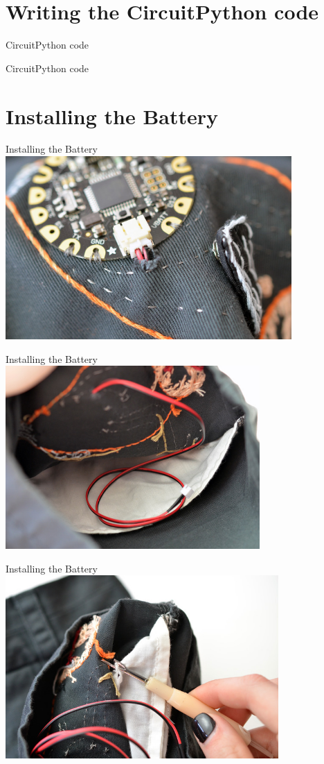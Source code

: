 \documentclass[aspectratio=169]{beamer}
\begin{document}
\part{Writing the CircuitPython code}
\begin{frame}[fragile]{CircuitPython code}

\end{frame}
\begin{frame}[fragile]{CircuitPython code}

\end{frame}
\part{Installing the Battery}
\begin{frame}[fragile]{Installing the Battery}
\includegraphics[height=2.75in]{flora-angler-embroidery-28.jpg}
\end{frame}
\begin{frame}[fragile]{Installing the Battery}
\includegraphics[height=2.75in]{flora-angler-embroidery-29.jpg}
\end{frame}
\begin{frame}[fragile]{Installing the Battery}
\includegraphics[height=2.75in]{flora-angler-embroidery-30.jpg}
\end{frame}
\end{document}
